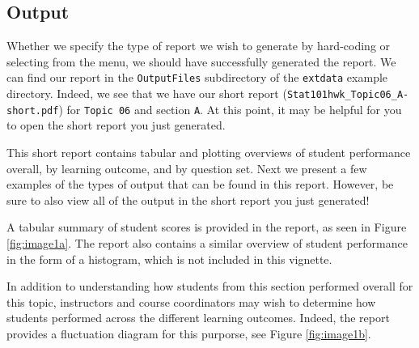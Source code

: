\documentclass[11pt,a4paper,oldfontcommands,openany]{memoir}
\numberwithin{equation}{section} %
\begin{document}
\subsection{Output}

Whether we specify the type of report we wish to generate by hard-coding or selecting from the menu, we should have successfully generated the report. We can find our report in the \texttt{OutputFiles} subdirectory of the \texttt{extdata} example directory. Indeed, we see that we have our short report (\texttt{Stat101hwk\_Topic06\_A-short.pdf}) for \texttt{Topic 06} and section \texttt{A}. At this point, it may be helpful for you to open the short report you just generated.

This short report contains tabular and plotting overviews of student performance overall, by learning outcome, and by question set. Next we present a few examples of the types of output that can be found in this report. However, be sure to also view all of the output in the short report you just generated!

A tabular summary of student scores is provided in the report, as seen in Figure \ref{fig:image1a}. The report also contains a similar overview of student performance in the form of a histogram, which is not included in this vignette.

\begin{center}
\captionsetup{width=0.65\textwidth}
\label{fig:image1a}
\end{center}

In addition to understanding how students from this section performed overall for this topic, instructors and course coordinators may wish to determine how students performed across the different learning outcomes. Indeed, the report provides a fluctuation diagram for this purporse, see Figure \ref{fig:image1b}.
\end{document}

